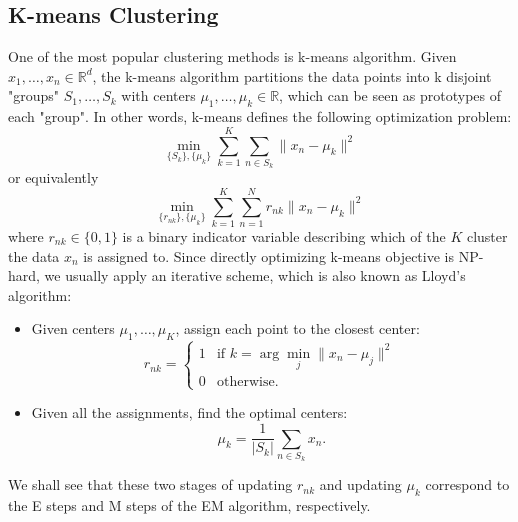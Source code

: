 \documentclass[../book-template.tex]{subfiles}
\begin{document}
\subsection{K-means Clustering}
One of the most popular clustering methods is k-means algorithm. Given $x_1,\dots,x_n\in \mathbb{R}^d$, the k-means algorithm partitions the data points into k disjoint "groups" $S_1,\dots,S_k$ with centers $\mu_1,\dots,\mu_k\in \mathbb{R}$, which can be seen as prototypes of each "group". In other words, k-means defines the following optimization problem:
\begin{equation*}
	\min_{\{S_k\},\{\mu_k\}}\sum_{k=1}^{K}\sum_{n\in S_k}\|x_n-\mu_k\|^2
\end{equation*}
or equivalently
\begin{equation*}
\min_{\{r_{nk}\},\{\mu_k\}}\sum_{k=1}^{K}\sum_{n=1}^{N}r_{nk}\|x_n-\mu_k\|^2
\end{equation*}
where $r_{nk}\in \{0,1\}$ is a binary indicator variable describing which of the $K$ cluster the data $x_n$ is assigned to. Since directly optimizing k-means objective is NP-hard, we usually apply an iterative scheme, which is also known as Lloyd's algorithm:
\begin{itemize}
	\item Given centers $\mu_1,\dots,\mu_K$, assign each point to the closest center:
	\begin{equation*}
		r_{nk}=\begin{cases}
		1& \text{if }k=\arg\min_j\|x_n-\mu_j\|^2\\
		0& \text{otherwise.}
		\end{cases}
	\end{equation*}
	\item Given all the assignments, find the optimal centers:
	\begin{equation*}
		\mu_k = \frac{1}{|S_k|}\sum_{n\in S_k}x_n.
	\end{equation*}
\end{itemize}
We shall see that these two stages of updating $r_{nk}$ and updating $\mu_k$ correspond to the E steps and M steps of the EM algorithm, respectively.
\end{document}

